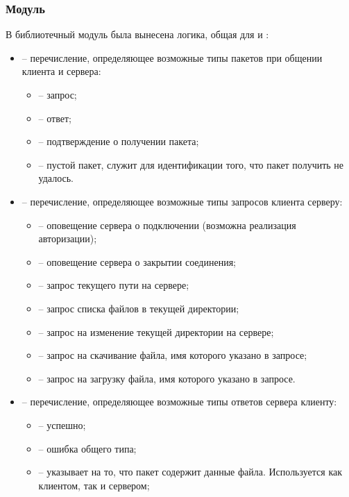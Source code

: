 \subsubsection{Модуль }

В библиотечный модуль  была вынесена логика, общая для  и :
\begin{itemize}
	\item {} -- перечисление, определяющее возможные типы пакетов при общении клиента и сервера:
		\begin{itemize}
			\item {} -- запрос;
			\item {} -- ответ;
			\item {} -- подтверждение о получении пакета;
			\item {} -- пустой пакет, служит для идентификации того, что пакет получить не удалось.
		\end{itemize}
	\item {} -- перечисление, определяющее возможные типы запросов клиента серверу:
		\begin{itemize}
			\item {} -- оповещение сервера о подключении (возможна реализация авторизации);
			\item {} -- оповещение сервера о закрытии соединения;
			\item {} -- запрос текущего пути на сервере;
			\item {} -- запрос списка файлов в текущей директории;
			\item {} -- запрос на изменение текущей директории на сервере;
			\item {} -- запрос на скачивание файла, имя которого указано в запросе;
			\item {} -- запрос на загрузку файла, имя которого указано в запросе.
		\end{itemize}
	\item {} -- перечисление, определяющее возможные типы ответов сервера клиенту:
		\begin{itemize}
			\item {} -- успешно;
			\item {} -- ошибка общего типа;
			\item {} -- указывает на то, что пакет содержит данные файла. Используется как клиентом, так и сервером;

\end{itemize}
\end{itemize}
